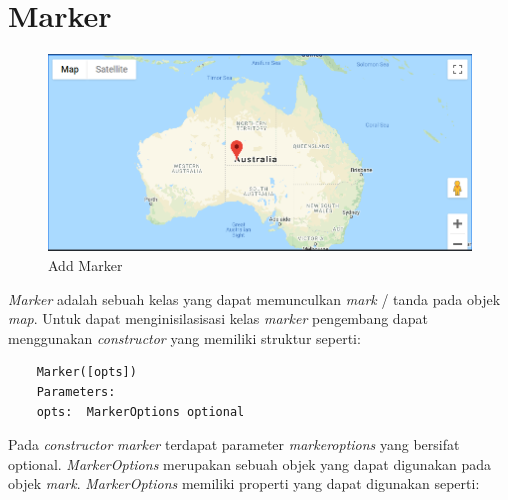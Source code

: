 \section{Marker}
\label{sec:mark}
  \begin{figure}[H]
    \centering
    \includegraphics[scale=0.5]{Gambar/add_marker.PNG}
    \caption{Add Marker}
    \label{fig:my_label}
\end{figure}

\textit{Marker} adalah sebuah kelas yang dapat memunculkan \textit{mark} / tanda pada objek \textit{map}. Untuk dapat menginisilasisasi kelas \textit{marker} pengembang dapat menggunakan \textit{constructor} yang memiliki struktur seperti:
\begin{lstlisting}
    Marker([opts])
    Parameters: 
    opts:  MarkerOptions optional
\end{lstlisting}
Pada \textit{constructor} \textit{marker} terdapat parameter \textit{markeroptions} yang bersifat optional. \textit{MarkerOptions} merupakan sebuah objek yang dapat digunakan pada objek \textit{mark}. \textit{MarkerOptions} memiliki properti yang dapat digunakan  seperti:

